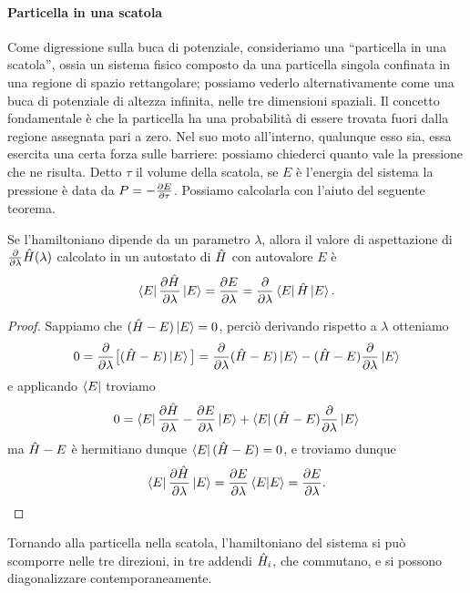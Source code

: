 \paragraph{Particella in una scatola}
Come digressione sulla buca di potenziale, consideriamo una ``particella in una scatola'', ossia un sistema fisico composto da una particella singola confinata in una regione di spazio rettangolare; possiamo vederlo alternativamente come una buca di potenziale di altezza infinita, nelle tre dimensioni spaziali.
Il concetto fondamentale è che la particella ha una probabilità di essere trovata fuori dalla regione assegnata pari a zero.
Nel suo moto all'interno, qualunque esso sia, essa esercita una certa forza sulle barriere: possiamo chiederci quanto vale la pressione che ne risulta.
Detto $\tau$ il volume della scatola, se $E$ è l'energia del sistema la pressione è data da $P=-\frac{\partial {E}}{\partial {\tau}}$.
Possiamo calcolarla con l'aiuto del seguente teorema.
\begin{teorema} \label{t:dipendenza-hamiltoniano-parametro}
	Se l'hamiltoniano dipende da un parametro $\lambda$, allora il valore di aspettazione di $\frac{\partial {}}{\partial {\lambda}}\hat{H}(\lambda)$ calcolato in un autostato di $\hat{H}$ con autovalore $E$ è
	\begin{equation}
		\left\langle{E}\right|\frac{\partial {\hat{H}}}{\partial {\lambda}}\left|{E}\right\rangle=\frac{\partial {E}}{\partial {\lambda}}=\frac{\partial {}}{\partial {\lambda}}\left\langle{E}\right|\hat{H}\left|{E}\right\rangle.
	\end{equation}
\end{teorema}
\begin{proof}
	Sappiamo che $(\hat{H}-E)\left|{E}\right\rangle=0$, perciò derivando rispetto a $\lambda$ otteniamo
	\begin{equation}
		0=\frac{\partial {}}{\partial {\lambda}}\big[(\hat{H}-E)\left|{E}\right\rangle\big]=\frac{\partial {}}{\partial {\lambda}}(\hat{H}-E)\left|{E}\right\rangle-(\hat{H}-E)\frac{\partial {}}{\partial {\lambda}}\left|{E}\right\rangle
	\end{equation}
	e applicando $\left\langle{E}\right|$ troviamo
	\begin{equation}
		0=\left\langle{E}\right|\frac{\partial {\hat{H}}}{\partial {\lambda}}-\frac{\partial {E}}{\partial {\lambda}}\left|{E}\right\rangle+\left\langle{E}\right|(\hat{H}-E)\frac{\partial {}}{\partial {\lambda}}\left|{E}\right\rangle
	\end{equation}
	ma $\hat{H}-E$ è hermitiano dunque $\left\langle{E}\right|(\hat{H}-E)=0$, e troviamo dunque
	\begin{equation}
		\left\langle{E}\right|\frac{\partial {\hat{H}}}{\partial {\lambda}}\left|{E}\right\rangle=\frac{\partial {E}}{\partial {\lambda}}\left\langle{E}\middle|{E}\right\rangle=\frac{\partial {E}}{\partial {\lambda}}.\qedhere
	\end{equation}
\end{proof}
Tornando alla particella nella scatola, l'hamiltoniano del sistema si può scomporre nelle tre direzioni, in tre addendi $\hat{H}_i$, che commutano, e si possono diagonalizzare contemporaneamente.
